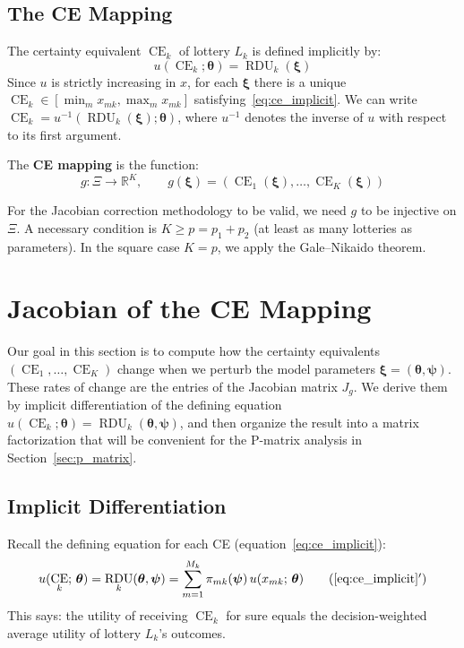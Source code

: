 \documentclass[11pt,a4paper]{article}
\theoremstyle{definition}
\newcommand{\R}{\mathbb{R}}
\newcommand{\btheta}{\boldsymbol{\theta}}
\newcommand{\bxi}{\boldsymbol{\xi}}
\newcommand{\bpsi}{\boldsymbol{\psi}}
\DeclareMathOperator{\CE}{CE}
\DeclareMathOperator{\RDU}{RDU}
\begin{document}
\subsection{The CE Mapping}

The certainty equivalent $\CE_k$ of lottery $L_k$ is defined implicitly by:
\begin{equation}
    \label{eq:ce_implicit}
    u(\CE_k; \btheta) = \RDU_k(\bxi)
\end{equation}
Since $u$ is strictly increasing in $x$, for each $\bxi$ there is a unique
$\CE_k \in [\min_m x_{mk}, \max_m x_{mk}]$ satisfying~\eqref{eq:ce_implicit}.
We can write $\CE_k = u^{-1}(\RDU_k(\bxi); \btheta)$, where $u^{-1}$ denotes
the inverse of $u$ with respect to its first argument.

The \textbf{CE mapping} is the function:
\begin{equation}
    \label{eq:g_map}
    g: \Xi \to \R^K, \qquad g(\bxi) = (\CE_1(\bxi), \ldots, \CE_K(\bxi))
\end{equation}

For the Jacobian correction methodology to be valid, we need $g$ to be
injective on $\Xi$. A necessary condition is $K \geq p = p_1 + p_2$ (at
least as many lotteries as parameters). In the square case $K = p$, we apply
the Gale--Nikaido theorem.


\section{Jacobian of the CE Mapping}
\label{sec:jacobian}

Our goal in this section is to compute how the certainty equivalents
$(\CE_1, \ldots, \CE_K)$ change when we perturb the model parameters $\bxi =
(\btheta, \bpsi)$. These rates of change are the entries of the Jacobian
matrix $J_g$. We derive them by implicit differentiation of the defining
equation $u(\CE_k; \btheta) = \RDU_k(\btheta, \bpsi)$, and then organize
the result into a matrix factorization that will be convenient for the
P-matrix analysis in Section~\ref{sec:p_matrix}.

\subsection{Implicit Differentiation}

Recall the defining equation for each CE (equation~\eqref{eq:ce_implicit}):
\begin{equation}
    u(\CE_k;\, \btheta) = \RDU_k(\btheta, \bpsi)
    = \sum_{m=1}^{M_k} \pi_{mk}(\bpsi) \, u(x_{mk};\, \btheta)
    \tag{\ref{eq:ce_implicit}$'$}
\end{equation}
This says: the utility of receiving $\CE_k$ for sure equals the
decision-weighted average utility of lottery $L_k$'s outcomes.
\end{document}
